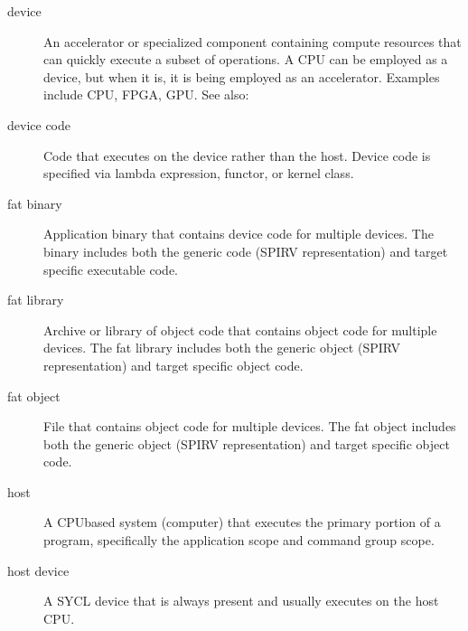 \documentclass[letterpaper,10pt,english]{sphinxmanual}
\begin{document}
\begin{description}
\item[{device\label{\detokenize{glossary:term-device}}}] \leavevmode
An accelerator or specialized component containing compute resources
that can quickly execute a subset of operations. A CPU can be
employed as a device, but when it is, it is being employed as an
accelerator. Examples include CPU, FPGA, GPU. See also: {\hyperref[\detokenize{glossary:term-accelerator}]{}}

\item[{device code\label{\detokenize{glossary:term-device-code}}}] \leavevmode
Code that executes on the device rather than the host. Device code is
specified via lambda expression, functor, or kernel class.

\item[{fat binary\label{\detokenize{glossary:term-fat-binary}}}] \leavevmode
Application binary that contains device code for multiple devices.
The binary includes both the generic code (SPIR\sphinxhyphen{}V representation) and
target specific executable code.

\item[{fat library\label{\detokenize{glossary:term-fat-library}}}] \leavevmode
Archive or library of object code that contains object code for
multiple devices. The fat library includes both the generic object
(SPIR\sphinxhyphen{}V representation) and target specific object code.

\item[{fat object\label{\detokenize{glossary:term-fat-object}}}] \leavevmode
File that contains object code for multiple devices. The fat object
includes both the generic object (SPIR\sphinxhyphen{}V representation) and target
specific object code.

\item[{host\label{\detokenize{glossary:term-host}}}] \leavevmode
A CPU\sphinxhyphen{}based system (computer) that executes the primary portion of a
program, specifically the application scope and command group scope.

\item[{host device\label{\detokenize{glossary:term-host-device}}}] \leavevmode
A SYCL device that is always present and usually executes on the host CPU.


\end{description}
\end{document}
